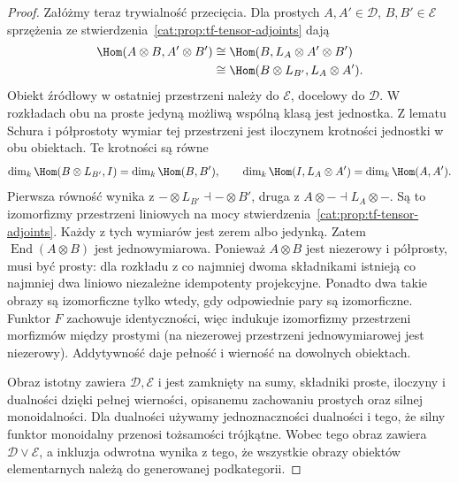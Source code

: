 \begin{proof}
Załóżmy teraz trywialność przecięcia. Dla prostych $A,A'\in\mathcal D$, $B,B'\in\mathcal E$ sprzężenia ze stwierdzenia~\ref{cat:prop:tf-tensor-adjoints} dają
\[
\begin{aligned}
 \Hom(A\otimes B,A'\otimes B')
 &\cong\Hom(B,L_A\otimes A'\otimes B')\\
 &\cong\Hom(B\otimes L_{B'},L_A\otimes A').
\end{aligned}
\]
Obiekt źródłowy w ostatniej przestrzeni należy do $\mathcal E$, docelowy do $\mathcal D$. W rozkładach obu na proste jedyną możliwą wspólną klasą jest jednostka. Z lematu Schura i półprostoty wymiar tej przestrzeni jest iloczynem krotności jednostki w obu obiektach. Te krotności są równe
\[
 \dim_k\Hom(B\otimes L_{B'},I)=\dim_k\Hom(B,B'),\qquad
 \dim_k\Hom(I,L_A\otimes A')=\dim_k\Hom(A,A').
\]
Pierwsza równość wynika z $-\otimes L_{B'}\dashv-\otimes B'$, druga z $A\otimes-\dashv L_A\otimes-$. Są to izomorfizmy przestrzeni liniowych na mocy stwierdzenia~\ref{cat:prop:tf-tensor-adjoints}. Każdy z tych wymiarów jest zerem albo jedynką. Zatem $\operatorname{End}(A\otimes B)$ jest jednowymiarowa. Ponieważ $A\otimes B$ jest niezerowy i półprosty, musi być prosty: dla rozkładu z co najmniej dwoma składnikami istnieją co najmniej dwa liniowo niezależne idempotenty projekcyjne. Ponadto dwa takie obrazy są izomorficzne tylko wtedy, gdy odpowiednie pary są izomorficzne. Funktor $F$ zachowuje identyczności, więc indukuje izomorfizmy przestrzeni morfizmów między prostymi (na niezerowej przestrzeni jednowymiarowej jest niezerowy). Addytywność daje pełność i wierność na dowolnych obiektach.

Obraz istotny zawiera $\mathcal D,\mathcal E$ i jest zamknięty na sumy, składniki proste, iloczyny i dualności dzięki pełnej wierności, opisanemu zachowaniu prostych oraz silnej monoidalności. Dla dualności używamy jednoznaczności dualności i tego, że silny funktor monoidalny przenosi tożsamości trójkątne. Wobec tego obraz zawiera $\mathcal D\vee\mathcal E$, a inkluzja odwrotna wynika z tego, że wszystkie obrazy obiektów elementarnych należą do generowanej podkategorii.
\end{proof}

